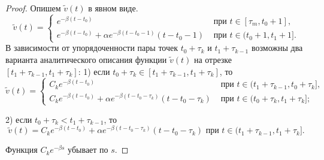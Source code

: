 \begin{proof}
	Опишем $\tilde{v}(t)$ в явном виде.
	\[
	\tilde{v}(t) = 
	\begin{cases}
		e^{-\beta(t-t_0)} & \text{ при } t\in[\tau_m,t_0+1],\\
		e^{-\beta(t-t_0)}+\alpha e^{-\beta (t-t_0-1)} (t-t_0-1) & \text{ при } t\in(t_0+1,t_1+1].
	\end{cases}
	\]
	В зависимости от упорядоченности пары точек $t_0+\tau_k$ и $t_1+\tau_{k-1}$ возможны два варианта аналитического описания функции $\tilde{v}(t)$ на отрезке $[t_1+\tau_{k-1},t_1+\tau_k]$:
	1) если $t_0+\tau_k\in[t_1+\tau_{k-1},t_1+\tau_k]$, то
	\begin{equation}
		\label{eq:v_hair1}
		\tilde{v}(t)=
		\begin{cases}
			C_k e^{-\beta(t-t_0)} & \text{ при } t\in(t_1+\tau_{k-1},t_0+\tau_k],\\
			C_k e^{-\beta(t-t_0)} + \alpha e^{-\beta (t-t_0-\tau_k)} (t-t_0-\tau_k) & \text{ при } t\in(t_0+\tau_k,t_1+\tau_k];
		\end{cases}
	\end{equation}
		
	2) если $t_0+\tau_{k} < t_1+\tau_{k-1}$, то
	\begin{equation}
		\label{eq:v_hair2} 
		\tilde{v}(t)= C_k e^{-\beta(t-t_0)}+\alpha e^{-\beta (t-t_0-\tau_k)} (t-t_0-\tau_k) \text{ при } t\in(t_1+\tau_{k-1},t_1+\tau_k].
	\end{equation}
	
	
	Функция $C_ke^{-\beta s}$ убывает по $s$.
	

\end{proof}
